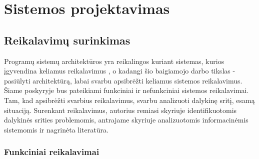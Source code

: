 \section{Sistemos projektavimas}

\subsection{Reikalavimų surinkimas}
Programų sistemų architektūros yra reikalingos kuriant sistemas, kurios įgyvendina keliamus reikalavimus \cite{Bass2013}, o kadangi šio baigiamojo darbo tikslas - pasiūlyti architektūrą, labai svarbu apsibrėžti keliamus sistemos reikalavimus. Šiame poskyryje bus pateikiami funkciniai ir nefunkciniai sistemos reikalavimai. Tam, kad apsibrėžti svarbius reikalavimus, svarbu analizuoti dalykinę sritį, esamą situaciją. Surenkant reikalavimus, autorius remiasi skyriuje identifikuotomis dalykinės srities problemomis, antrajame skyriuje analizuotomis informacinėmis sistemomis ir nagrinėta literatūra.
\subsubsection{Funkciniai reikalavimai}

